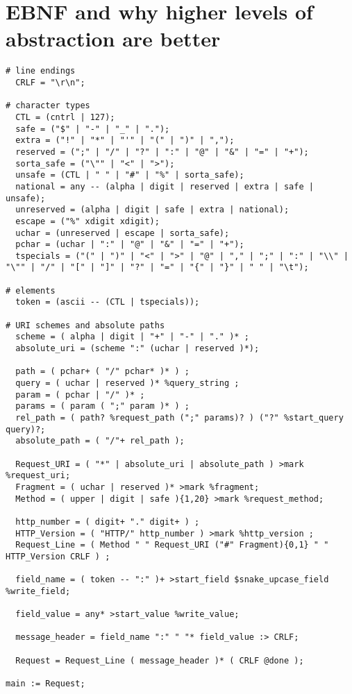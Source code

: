 \section{EBNF and why higher levels of abstraction are better}

\begin{lstlisting}
# line endings
  CRLF = "\r\n";
 
# character types
  CTL = (cntrl | 127);
  safe = ("$" | "-" | "_" | ".");
  extra = ("!" | "*" | "'" | "(" | ")" | ",");
  reserved = (";" | "/" | "?" | ":" | "@" | "&" | "=" | "+");
  sorta_safe = ("\"" | "<" | ">");
  unsafe = (CTL | " " | "#" | "%" | sorta_safe);
  national = any -- (alpha | digit | reserved | extra | safe | unsafe);
  unreserved = (alpha | digit | safe | extra | national);
  escape = ("%" xdigit xdigit);
  uchar = (unreserved | escape | sorta_safe);
  pchar = (uchar | ":" | "@" | "&" | "=" | "+");
  tspecials = ("(" | ")" | "<" | ">" | "@" | "," | ";" | ":" | "\\" | "\"" | "/" | "[" | "]" | "?" | "=" | "{" | "}" | " " | "\t");
 
# elements
  token = (ascii -- (CTL | tspecials));
 
# URI schemes and absolute paths
  scheme = ( alpha | digit | "+" | "-" | "." )* ;
  absolute_uri = (scheme ":" (uchar | reserved )*);
 
  path = ( pchar+ ( "/" pchar* )* ) ;
  query = ( uchar | reserved )* %query_string ;
  param = ( pchar | "/" )* ;
  params = ( param ( ";" param )* ) ;
  rel_path = ( path? %request_path (";" params)? ) ("?" %start_query query)?;
  absolute_path = ( "/"+ rel_path );
 
  Request_URI = ( "*" | absolute_uri | absolute_path ) >mark %request_uri;
  Fragment = ( uchar | reserved )* >mark %fragment;
  Method = ( upper | digit | safe ){1,20} >mark %request_method;
 
  http_number = ( digit+ "." digit+ ) ;
  HTTP_Version = ( "HTTP/" http_number ) >mark %http_version ;
  Request_Line = ( Method " " Request_URI ("#" Fragment){0,1} " " HTTP_Version CRLF ) ;
 
  field_name = ( token -- ":" )+ >start_field $snake_upcase_field %write_field;
 
  field_value = any* >start_value %write_value;
 
  message_header = field_name ":" " "* field_value :> CRLF;
 
  Request = Request_Line ( message_header )* ( CRLF @done );
 
main := Request;
\end{lstlisting}